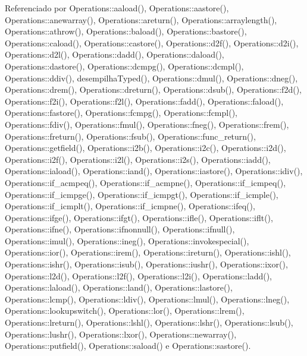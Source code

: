 Referenciado por Operations\+::aaload(), Operations\+::aastore(), Operations\+::anewarray(), Operations\+::areturn(), Operations\+::arraylength(), Operations\+::athrow(), Operations\+::baload(), Operations\+::bastore(), Operations\+::caload(), Operations\+::castore(), Operations\+::d2f(), Operations\+::d2i(), Operations\+::d2l(), Operations\+::dadd(), Operations\+::daload(), Operations\+::dastore(), Operations\+::dcmpg(), Operations\+::dcmpl(), Operations\+::ddiv(), desempilha\+Typed(), Operations\+::dmul(), Operations\+::dneg(), Operations\+::drem(), Operations\+::dreturn(), Operations\+::dsub(), Operations\+::f2d(), Operations\+::f2i(), Operations\+::f2l(), Operations\+::fadd(), Operations\+::faload(), Operations\+::fastore(), Operations\+::fcmpg(), Operations\+::fcmpl(), Operations\+::fdiv(), Operations\+::fmul(), Operations\+::fneg(), Operations\+::frem(), Operations\+::freturn(), Operations\+::fsub(), Operations\+::func\+\_\+return(), Operations\+::getfield(), Operations\+::i2b(), Operations\+::i2c(), Operations\+::i2d(), Operations\+::i2f(), Operations\+::i2l(), Operations\+::i2s(), Operations\+::iadd(), Operations\+::iaload(), Operations\+::iand(), Operations\+::iastore(), Operations\+::idiv(), Operations\+::if\+\_\+acmpeq(), Operations\+::if\+\_\+acmpne(), Operations\+::if\+\_\+icmpeq(), Operations\+::if\+\_\+icmpge(), Operations\+::if\+\_\+icmpgt(), Operations\+::if\+\_\+icmple(), Operations\+::if\+\_\+icmplt(), Operations\+::if\+\_\+icmpne(), Operations\+::ifeq(), Operations\+::ifge(), Operations\+::ifgt(), Operations\+::ifle(), Operations\+::iflt(), Operations\+::ifne(), Operations\+::ifnonnull(), Operations\+::ifnull(), Operations\+::imul(), Operations\+::ineg(), Operations\+::invokespecial(), Operations\+::ior(), Operations\+::irem(), Operations\+::ireturn(), Operations\+::ishl(), Operations\+::ishr(), Operations\+::isub(), Operations\+::iushr(), Operations\+::ixor(), Operations\+::l2d(), Operations\+::l2f(), Operations\+::l2i(), Operations\+::ladd(), Operations\+::laload(), Operations\+::land(), Operations\+::lastore(), Operations\+::lcmp(), Operations\+::ldiv(), Operations\+::lmul(), Operations\+::lneg(), Operations\+::lookupswitch(), Operations\+::lor(), Operations\+::lrem(), Operations\+::lreturn(), Operations\+::lshl(), Operations\+::lshr(), Operations\+::lsub(), Operations\+::lushr(), Operations\+::lxor(), Operations\+::newarray(), Operations\+::putfield(), Operations\+::saload() e Operations\+::sastore().

